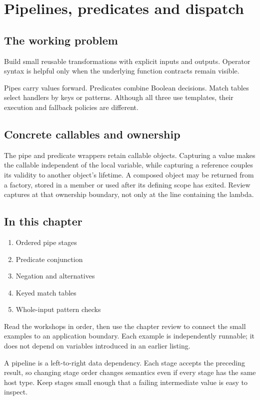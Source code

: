 \chapter{Pipelines, predicates and dispatch}\label{ch:2}
\section*{The working problem}
Build small reusable transformations with explicit inputs and outputs. Operator syntax is helpful only when the underlying function contracts remain visible.

Pipes carry values forward. Predicates combine Boolean decisions. Match tables select handlers by keys or patterns. Although all three use templates, their execution and fallback policies are different.

\section*{Concrete callables and ownership}
The pipe and predicate wrappers retain callable objects. Capturing a value makes the callable independent of the local variable, while capturing a reference couples its validity to another object's lifetime. A composed object may be returned from a factory, stored in a member or used after its defining scope has exited. Review captures at that ownership boundary, not only at the line containing the lambda.

\section*{In this chapter}
\begin{enumerate}
\item Ordered pipe stages
\item Predicate conjunction
\item Negation and alternatives
\item Keyed match tables
\item Whole-input pattern checks
\end{enumerate}
Read the workshops in order, then use the chapter review to connect the small examples to an application boundary. Each example is independently runnable; it does not depend on variables introduced in an earlier listing.

\clearpage
{}
A pipeline is a left-to-right data dependency. Each stage accepts the preceding result, so changing stage order changes semantics even if every stage has the same host type. Keep stages small enough that a failing intermediate value is easy to inspect.

